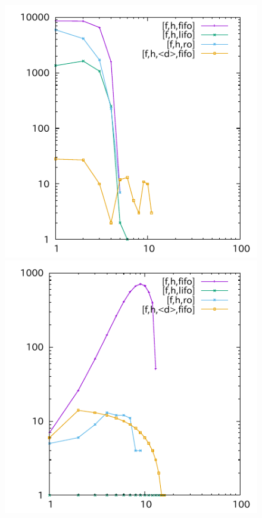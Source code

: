 \begin{figure}[tb]
\includegraphics{img/depth/psr-small-open/p46.pdf}
\includegraphics{img/depth/rovers-fuel/p07.pdf}

\end{figure}
